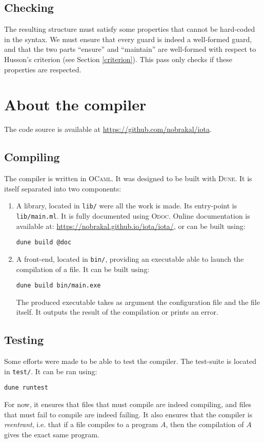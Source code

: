 \documentclass[10pt,a4paper]{article}
\newcommand\Odoc{\textsc{Odoc}}
\newcommand\Ocaml{\textsc{OCaml}}
\newcommand\Dune{\textsc{Dune}}
\begin{document}
\subsection{Checking}
\label{subsec:verification}
The resulting structure must satisfy some properties that cannot be hard-coded in the syntax. We must ensure that every guard is indeed a well-formed guard, and that the two parts ``ensure'' and ``maintain'' are well-formed with respect to Husson's criterion (see Section \ref{criterion}). This pass only checks if these properties are respected.

\section{About the compiler}
The code source is available at \url{https://github.com/nobrakal/iota}.
\subsection{Compiling}
The compiler is written in \Ocaml{}\cite{ocaml}. It was designed to be built with \Dune{}\cite{dune}.
It is itself separated into two components:

\begin{enumerate}
\item A library, located in \verb|lib/| were all the work is made. Its entry-point is \verb|lib/main.ml|. It is fully documented using \Odoc{}\cite{odoc}. Online documentation is available at: \url{https://nobrakal.github.io/iota/iota/}, or can be built using:
\begin{verbatim}
dune build @doc
\end{verbatim}
\item A front-end, located in \verb|bin/|, providing an executable able to launch the compilation of a file. It can be built using:
\begin{verbatim}
dune build bin/main.exe
\end{verbatim}
  The produced executable takes as argument the configuration file and the file itself. It outputs the result of the compilation or prints an error.
\end{enumerate}

\subsection{Testing}
Some efforts were made to be able to test the compiler. The test-suite is located in \verb|test/|. It can be ran using:
\begin{verbatim}
dune runtest
\end{verbatim}
For now, it ensures that files that must compile are indeed compiling, and files that must fail to compile are indeed failing. It also ensures that the compiler is \emph{reentrant}, i.e. that if a file compiles to a program $A$, then the compilation of $A$ gives the exact same program.
\end{document}
